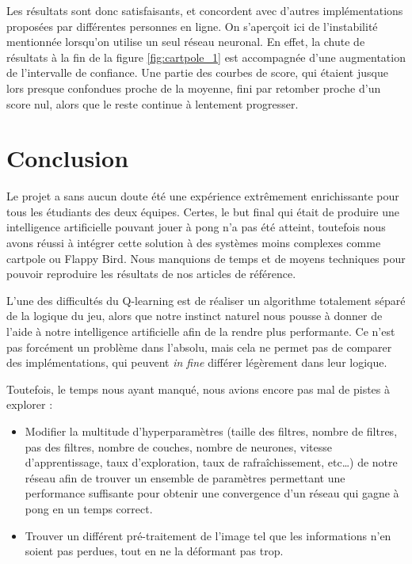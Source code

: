 \documentclass[
    10pt,
    a4paper,
    oneside,
    headinclude,footinclude,
    BCOR=5mm,
    captions=tableabove
]{scrartcl}
\begin{document}
Les résultats sont donc satisfaisants, et concordent avec d'autres implémentations proposées par différentes personnes en ligne. On s'aperçoit ici de l'instabilité mentionnée lorsqu'on utilise un seul réseau neuronal.
En effet, la chute de résultats à la fin de la figure \ref{fig:cartpole_1} est accompagnée d'une augmentation de l'intervalle de confiance.
Une partie des courbes de score, qui étaient jusque lors presque confondues proche de la moyenne, fini par retomber proche d'un score nul, alors que le reste continue à lentement progresser.

\newpage
\section*{Conclusion}
Le projet a sans aucun doute été une expérience extrêmement enrichissante pour tous les étudiants des deux équipes. Certes, le but final qui était de produire une intelligence artificielle pouvant jouer à pong n’a pas été atteint, toutefois nous avons réussi à intégrer cette solution à des systèmes moins complexes comme cartpole ou Flappy Bird. Nous manquions de temps et de moyens techniques pour pouvoir reproduire les résultats de nos articles de référence.

L'une des difficultés du Q-learning est de réaliser un algorithme totalement séparé de la logique du jeu, alors que notre instinct naturel nous pousse à donner de l'aide à notre intelligence artificielle afin de la rendre plus performante. Ce n'est pas forcément un problème dans l'absolu, mais cela ne permet pas de comparer des implémentations, qui peuvent \textit{in fine} différer légèrement dans leur logique.

Toutefois, le temps nous ayant manqué, nous avions encore pas mal de pistes à explorer :

\begin{itemize}
\item Modifier la multitude d’hyperparamètres (taille des filtres, nombre de filtres, pas des filtres, nombre de couches, nombre de neurones, vitesse d’apprentissage, taux d’exploration, taux de rafraîchissement, etc…) de notre réseau afin de trouver un ensemble de paramètres permettant une performance suffisante pour obtenir une convergence d’un réseau qui gagne à pong en un temps correct.
\item Trouver un différent pré-traitement de l’image tel que les informations n’en soient pas perdues, tout en ne la déformant pas trop.
\end{itemize}

\newpage
\renewcommand{\refname}{\spacedlowsmallcaps{Références}} %
\nocite{*}


\end{document}
